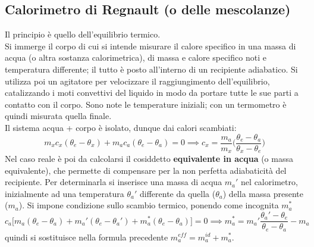 \documentclass[10pt, oneside]{book}
\newcommand{\ds}{\displaystyle}
\begin{document}
\subsection{Calorimetro di Regnault (o delle mescolanze)}
Il principio è quello dell'equilibrio termico. \\
Si immerge il corpo di cui si intende misurare il calore specifico in una massa di acqua (o altra sostanza calorimetrica), di massa e calore specifico noti e temperatura differente; il tutto è posto all'interno di un recipiente adiabatico. Si utilizza poi un agitatore per velocizzare il raggiungimento dell'equilibrio, catalizzando i moti convettivi del liquido in modo da portare tutte le sue parti a contatto con il corpo. Sono note le temperature iniziali; con un termometro è quindi misurata quella finale.\\
Il sistema acqua + corpo è isolato, dunque dai calori scambiati:
\[m_x c_x (\theta_e - \theta_x) + m_a c_a (\theta_e - \theta_a) = 0 \implies c_x = \frac{m_a}{m_x}\bigg(\frac{\theta_e - \theta_a}{\theta_x - \theta_e}\bigg)\]
Nel caso reale è poi da calcolarsi il cosiddetto \textbf{equivalente in acqua} (o massa equivalente), che permette di compensare per la non perfetta adiabaticità del recipiente. Per determinarla si inserisce una massa di acqua $m_a'$ nel calorimetro, inizialmente ad una temperatura $\theta_a'$ differente da quella ($\theta_a$) della massa presente ($m_a$). Si impone condizione sullo scambio termico, ponendo come incognita $m^\ast_a$
\[c_a \big[m_a (\theta_e - \theta_a) + m_a' (\theta_e - \theta_a') + m_a^\ast (\theta_e - \theta_a)\big] = 0 \implies m_a^\ast = m_a' \frac{\theta_a' - \theta_e}{\theta_e - \theta_a} - m_a\]
quindi si sostituisce nella formula precedente $\ds m_a^{eff} = m_a^{id} + m_a^\ast$.
\end{document}
